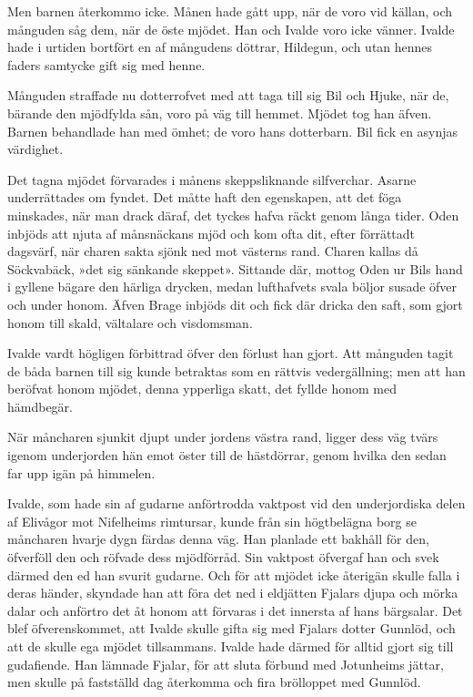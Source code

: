 Men barnen återkommo icke. Månen hade gått upp, när de voro vid källan,
och månguden såg dem, när de öste mjödet. Han och Ivalde voro icke
vänner. Ivalde hade i
\protect\hypertarget{lb1625905.xhtmlux5cux23start68}{}{}\protect\hypertarget{lb1625905.xhtmlux5cux23start68-a}{}{}\protect\hypertarget{lb1625905.xhtmlux5cux23start68-b}{}{}\protect\hypertarget{lb1625905.xhtmlux5cux23start68-c}{}{}\protect\hypertarget{lb1625905.xhtmlux5cux23start68-d}{}{}
urtiden bortfört en af mångudens döttrar, Hildegun, och utan hennes
faders samtycke gift sig med henne.

Månguden straffade nu dotterrofvet med att taga till sig Bil och Hjuke,
när de, bärande den mjödfylda sån, voro på väg till hemmet. Mjödet tog
han äfven. Barnen behandlade han med ömhet; de voro hans dotterbarn. Bil
fick en asynjas värdighet.

Det tagna mjödet förvarades i månens skeppsliknande silfverchar. Asarne
underrättades om fyndet. Det måtte haft den egenskapen, att det föga
minskades, när man drack däraf, det tyckes hafva räckt genom långa
tider. Oden inbjöds att njuta af månsnäckans mjöd och kom ofta dit,
efter förrättadt dagsvärf, när charen sakta sjönk ned mot västerns rand.
Charen kallas då Söckvabäck, »det sig sänkande skeppet». Sittande där,
mottog Oden ur Bils hand i gyllene bägare den härliga drycken, medan
lufthafvets svala böljor susade öfver och under honom. Äfven Brage
inbjöds dit och fick där dricka den saft, som gjort honom till skald,
vältalare och visdomsman.

Ivalde vardt högligen förbittrad öfver den förlust han gjort. Att
månguden tagit de båda barnen till sig kunde betraktas som en rättvis
vedergällning; men att han beröfvat honom mjödet, denna ypperliga skatt,
det fyllde honom med hämdbegär.

När måncharen sjunkit djupt under jordens västra rand, ligger dess väg
tvärs igenom underjorden hän emot öster till de hästdörrar, genom hvilka
den sedan far upp igän på himmelen.

Ivalde, som hade sin af gudarne anförtrodda vaktpost vid den
underjordiska delen af Elivågor mot Nifelheims rimtursar, kunde från sin
högtbelägna borg se måncharen hvarje dygn färdas denna väg. Han planlade
ett bakhåll för den, öfverföll den och röfvade dess mjödförråd. Sin
vaktpost öfvergaf han och svek därmed den ed han svurit gudarne. Och för
att mjödet icke återigän skulle falla i deras händer, skyndade han att
föra det ned i eldjätten Fjalars djupa och mörka
\protect\hypertarget{lb1625905.xhtmlux5cux23start69}{}{}\protect\hypertarget{lb1625905.xhtmlux5cux23start69-a}{}{}\protect\hypertarget{lb1625905.xhtmlux5cux23start69-b}{}{}\protect\hypertarget{lb1625905.xhtmlux5cux23start69-c}{}{}\protect\hypertarget{lb1625905.xhtmlux5cux23start69-d}{}{}
dalar och anförtro det åt honom att förvaras i det innersta af hans
bärgsalar. Det blef öfverenskommet, att Ivalde skulle gifta sig med
Fjalars dotter Gunnlöd, och att de skulle ega mjödet tillsammans. Ivalde
hade därmed för alltid gjort sig till gudafiende. Han lämnade Fjalar,
för att sluta förbund med Jotunheims jättar, men skulle på fastställd
dag återkomma och fira brölloppet med Gunnlöd.

